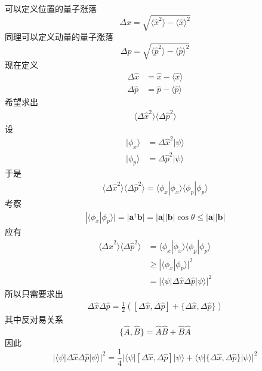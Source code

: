 \documentclass[12pt]{article}
\begin{document}
可以定义位置的量子涨落
\begin{equation*}
    \Delta x = \sqrt{\langle \hat{x}^2 \rangle - \langle \hat{x} \rangle^2}
\end{equation*}
同理可以定义动量的量子涨落
\begin{equation*}
    \Delta p = \sqrt{\langle \hat{p}^2 \rangle - \langle \hat{p} \rangle^2}
\end{equation*}
现在定义 
\begin{align*}
    \Delta \hat{x} &= \hat{x} - \langle \hat{x} \rangle \\
    \Delta \hat{p} &= \hat{p} - \langle \hat{p} \rangle
\end{align*}
希望求出
\begin{align*}
    \langle \Delta \hat{x}^2\rangle\langle \Delta \hat{p}^2\rangle
\end{align*}
设
\begin{align*}
    |\phi_x \rangle &= \Delta \hat{x}^2|\psi\rangle\\
    |\phi_p \rangle &= \Delta \hat{p}^2|\psi\rangle
\end{align*}
于是 
\begin{align*}
    \langle \Delta \hat{x}^2\rangle\langle \Delta \hat{p}^2\rangle = \langle \phi_x | \phi_x \rangle \langle \phi_p | \phi_p \rangle
\end{align*}
考察
\begin{align*}
    |\langle \phi_x | \phi_p \rangle| = |\bm{a}^\dagger \bm{b}| = |\bm{a}||\bm{b}|\cos{\theta} \leqslant |\bm{a}||\bm{b}|
\end{align*}
应有
\begin{align*}
    \langle \Delta \hat{x}^2\rangle\langle \Delta \hat{p}^2\rangle &= \langle \phi_x | \phi_x \rangle \langle \phi_p | \phi_p \rangle\\ &\geqslant |\langle \phi_x|\phi_p \rangle|^2\\
    &= |\langle \psi |\Delta \hat{x} \Delta \hat{p}|\psi \rangle|^2
\end{align*}
所以只需要求出
\begin{align*}
    \Delta \hat{x} \Delta \hat{p} = \frac 12([\Delta \hat{x}, \Delta \hat{p}] + \{\Delta \hat{x}, \Delta \hat{p}\})
\end{align*}
其中反对易关系
\begin{equation*}
    \{\hat{A}, \hat{B}\} = \hat{A}\hat{B} + \hat{B}\hat{A}
\end{equation*}
因此
\begin{equation*}
    |\langle \psi |\Delta \hat{x} \Delta \hat{p}|\psi \rangle|^2 = \frac 14 |\langle \psi |[\Delta \hat{x},\Delta \hat{p}]|\psi \rangle + \langle \psi |\{\Delta \hat{x},\Delta \hat{p}\}|\psi \rangle|^2
\end{equation*}
\end{document}
